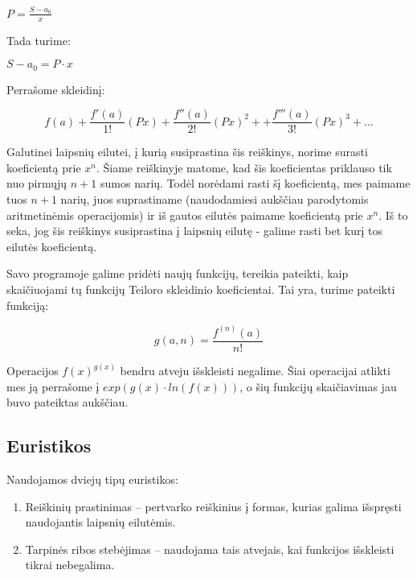 	$P = \frac{S - a_0}{x}$
	
	Tada turime: 
	
	$S - a_0 = P \cdotp x$
	
	Perrašome skleidinį:
	
	\[f(a) + \frac{f'(a)}{1!}(Px)+\frac{f''(a)}{2!}(Px)^2 + +\frac{f'''(a)}{3!}(Px)^3 + ...\]
	
	Galutinei laipsnių eilutei, į kurią susiprastina šis reiškinys, norime surasti koeficientą prie $x^n$. 
	Šiame reiškinyje matome, kad šis koeficientas priklauso tik nuo pirmųjų $n+1$ sumos narių. 
	Todėl norėdami rasti šį koeficientą, mes paimame tuos $n+1$ narių, juos suprastiname (naudodamiesi aukščiau parodytomis aritmetinėmis operacijomis) 
	ir iš gautos eilutės paimame koeficientą prie $x^n$. 
	Iš to seka, jog šis reiškinys susiprastina į laipsnių eilutę - galime rasti bet kurį tos eilutės koeficientą.
	
	Savo programoje galime pridėti naujų funkcijų, tereikia pateikti, kaip skaičiuojami tų funkcijų Teiloro skleidinio koeficientai. 
	Tai yra, turime pateikti funkciją: 
	
	\[ g(a,n) = \frac{f^{(n)}(a)}{n!}\]
    
    Operacijos $f(x)^{g(x)}$ bendru atveju išskleisti negalime. Šiai operacijai atlikti mes ją perrašome į $exp(g(x) \cdotp ln(f(x)))$,
    o šių funkcijų skaičiavimas jau buvo pateiktas aukščiau.
\subsection{Euristikos}
    Naudojamos dviejų tipų euristikos:
    \begin{enumerate}
        \item Reiškinių prastinimas -- pertvarko reiškinius į formas, kurias galima išspręsti naudojantis laipsnių eilutėmis.
        \item Tarpinės ribos stebėjimas -- naudojama tais atvejais, kai funkcijos išskleisti tikrai nebegalima.
    \end{enumerate}

